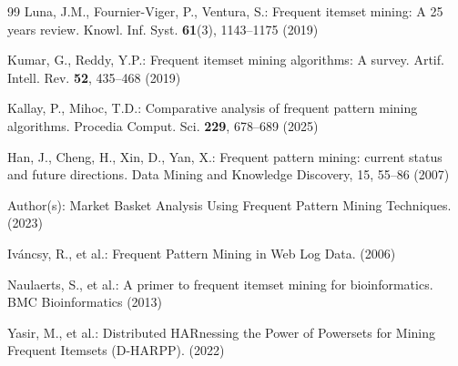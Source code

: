 \begin{thebibliography}{99}
Luna, J.M., Fournier-Viger, P., Ventura, S.: Frequent itemset mining: A 25 years review. 
Knowl. Inf. Syst. \textbf{61}(3), 1143--1175 (2019)

Kumar, G., Reddy, Y.P.: Frequent itemset mining algorithms: A survey. 
Artif. Intell. Rev. \textbf{52}, 435--468 (2019)

Kallay, P., Mihoc, T.D.: Comparative analysis of frequent pattern mining algorithms. 
Procedia Comput. Sci. \textbf{229}, 678--689 (2025)

Han, J., Cheng, H., Xin, D., Yan, X.: Frequent pattern mining: current status and future directions. Data Mining and Knowledge Discovery, 15, 55–86 (2007)

Author(s): Market Basket Analysis Using Frequent Pattern Mining Techniques. (2023)

Iváncsy, R., et al.: Frequent Pattern Mining in Web Log Data. (2006)

Naulaerts, S., et al.: A primer to frequent itemset mining for bioinformatics. BMC Bioinformatics (2013)

Yasir, M., et al.: Distributed HARnessing the Power of Powersets for Mining Frequent Itemsets (D-HARPP). (2022)



\end{thebibliography}



